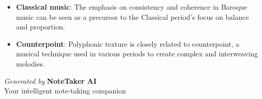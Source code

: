 \documentclass[11pt,letterpaper]{article}
\begin{document}
\begin{itemize}
  \item \textbf{Classical music}: The emphasis on consistency and coherence in Baroque music can be seen as a precursor to the Classical period's focus on balance and proportion.
  \item \textbf{Counterpoint}: Polyphonic texture is closely related to counterpoint, a musical technique used in various periods to create complex and interweaving melodies.
\end{itemize}

\vspace{2cm}

\begin{center}
\begin{tcolorbox}[
    colback=primarycolor!5,
    colframe=primarycolor!30,
    boxrule=0.5pt,
    arc=4pt,
    width=0.7\textwidth,
    left=10pt,
    right=10pt,
    top=6pt,
    bottom=6pt
]
    \centering
    \textcolor{primarycolor!80}{\small\textit{Generated by}} \textcolor{primarycolor}{\small\textbf{NoteTaker AI}} \\[-2pt]
    \textcolor{secondarycolor!60}{\tiny Your intelligent note-taking companion}
\end{tcolorbox}
\end{center}
\end{document}
